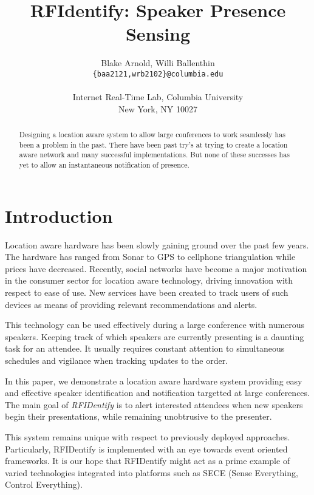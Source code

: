 \documentclass{article}
\title{RFIdentify: Speaker Presence Sensing}
\author{Blake Arnold, Willi Ballenthin\\
	{\tt\{baa2121,wrb2102\}@columbia.edu}\\
	\\
	Internet Real-Time Lab, Columbia University\\
	New York, NY 10027\\
	}
\begin{document}
\makecover
\maketitle

\begin{abstract}
	
	Designing a location aware system to allow large conferences to work seamlessly has been a problem in the past. There have been
	 past try's at trying to create a location aware network and many successful implementations. But none of these successes has yet to allow an instantaneous notification of presence.

\end{abstract}


\section{Introduction} 
	
	Location aware hardware has been slowly gaining ground over the past few years. The hardware 
	has ranged from Sonar to GPS to cellphone triangulation while prices have decreased.  
        Recently, social networks have become a major motivation in the consumer sector for location
        aware technology, driving innovation with respect to ease of use.
        New services have been created to track users of such devices as means of providing relevant
        recommendations and alerts.

	This technology can be used effectively during a large conference with numerous speakers.
	Keeping track of which speakers are currently presenting is a daunting task for an attendee. 
        It usually requires constant attention to simultaneous schedules and vigilance when tracking
        updates to the order.

	In this paper, we demonstrate a location aware hardware system providing easy and effective 
        speaker identification and notification targetted at large conferences.
        The main goal of \textit{RFIDentify} is to alert interested  
	attendees when new speakers begin their presentations, while remaining unobtrusive to the 
        presenter.

        This system remains unique with respect to previously deployed approaches.  Particularly,
        RFIDentify is implemented with an eye towards event oriented frameworks.  It is our hope
        that RFIDentify might act as a prime example of varied technologies integrated into platforms
        such as SECE (Sense Everything, Control Everything).
\end{document}
